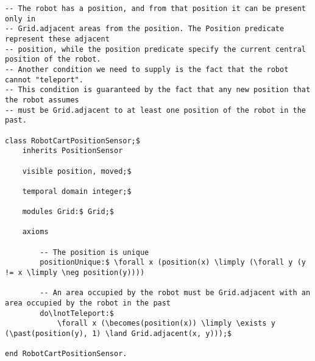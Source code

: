 \begin{lstlisting}[fontadjust, mathescape, frame=tlb] 
-- The robot has a position, and from that position it can be present only in
-- Grid.adjacent areas from the position. The Position predicate represent these adjacent
-- position, while the position predicate specify the current central position of the robot.
-- Another condition we need to supply is the fact that the robot cannot "teleport".
-- This condition is guaranteed by the fact that any new position that the robot assumes
-- must be Grid.adjacent to at least one position of the robot in the past.

class RobotCartPositionSensor;$ 
    inherits PositionSensor
    
    visible position, moved;$
    
    temporal domain integer;$

    modules Grid:$ Grid;$
    
    axioms
    
        -- The position is unique
        positionUnique:$ \forall x (position(x) \limply (\forall y (y != x \limply \neg position(y))))            

        -- An area occupied by the robot must be Grid.adjacent with an area occupied by the robot in the past
        do\lnotTeleport:$
            \forall x (\becomes(position(x)) \limply \exists y (\past(position(y), 1) \land Grid.adjacent(x, y)));$
            
end RobotCartPositionSensor.\end{lstlisting}